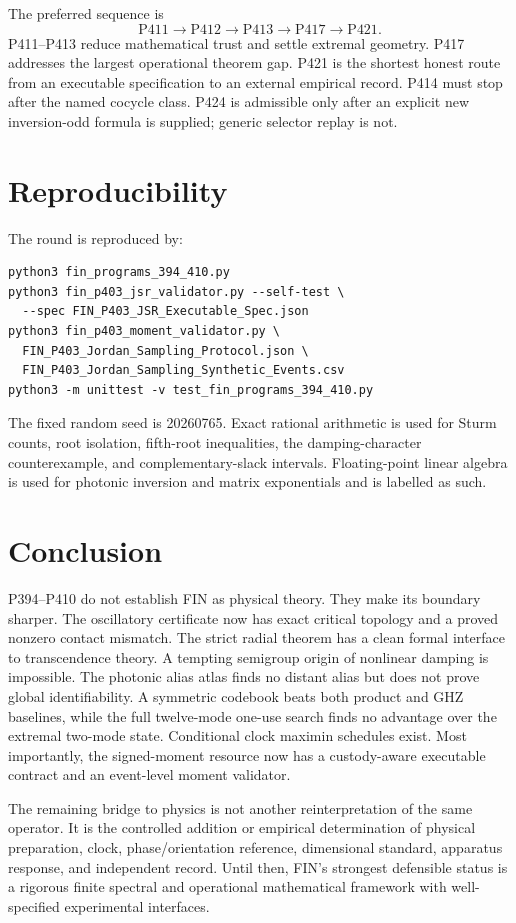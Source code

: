 \documentclass[11pt,a4paper,openany]{report}
\begin{document}
The preferred sequence is
\[
\boxed{\mathrm{P411}\to\mathrm{P412}\to\mathrm{P413}
\to\mathrm{P417}\to\mathrm{P421}.}
\]
P411--P413 reduce mathematical trust and settle extremal geometry. P417
addresses the largest operational theorem gap. P421 is the shortest honest
route from an executable specification to an external empirical record.
P414 must stop after the named cocycle class. P424 is admissible only after an
explicit new inversion-odd formula is supplied; generic selector replay is
not.

\chapter{Reproducibility}

The round is reproduced by:
\begin{verbatim}
python3 fin_programs_394_410.py
python3 fin_p403_jsr_validator.py --self-test \
  --spec FIN_P403_JSR_Executable_Spec.json
python3 fin_p403_moment_validator.py \
  FIN_P403_Jordan_Sampling_Protocol.json \
  FIN_P403_Jordan_Sampling_Synthetic_Events.csv
python3 -m unittest -v test_fin_programs_394_410.py
\end{verbatim}
The fixed random seed is 20260765. Exact rational arithmetic is used for
Sturm counts, root isolation, fifth-root inequalities, the damping-character
counterexample, and complementary-slack intervals. Floating-point linear
algebra is used for photonic inversion and matrix exponentials and is labelled
as such.

\chapter{Conclusion}

P394--P410 do not establish FIN as physical theory. They make its boundary
sharper. The oscillatory certificate now has exact critical topology and a
proved nonzero contact mismatch. The strict radial theorem has a clean formal
interface to transcendence theory. A tempting semigroup origin of nonlinear
damping is impossible. The photonic alias atlas finds no distant alias but
does not prove global identifiability. A symmetric codebook beats both
product and GHZ baselines, while the full twelve-mode one-use search finds no
advantage over the extremal two-mode state. Conditional clock maximin
schedules exist. Most importantly, the signed-moment resource now has a
custody-aware executable contract and an event-level moment validator.

The remaining bridge to physics is not another reinterpretation of the same
operator. It is the controlled addition or empirical determination of
physical preparation, clock, phase/orientation reference, dimensional
standard, apparatus response, and independent record. Until then, FIN's
strongest defensible status is a rigorous finite spectral and operational
mathematical framework with well-specified experimental interfaces.
\end{document}
